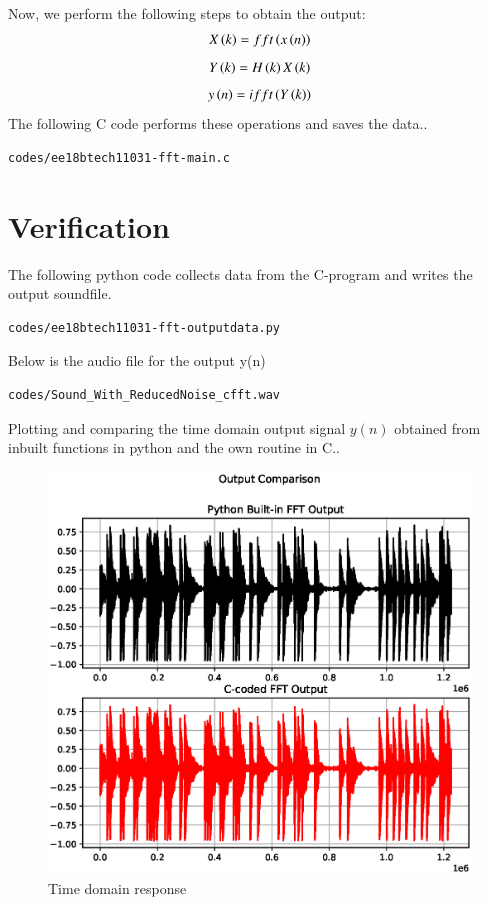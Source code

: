 \documentclass[journal,12pt,twocolumn]{IEEEtran}
\begin{document}
Now, we perform the following steps to obtain the output:
\begin{align}
    X\left(k\right) = fft\left(x\left(n\right)\right)
\end{align}
\begin{align}
    Y\left(k\right) = H\left(k\right)X\left(k\right)
\end{align}
\begin{align}
    y\left(n\right) = ifft\left(Y\left(k\right)\right)
\end{align}
The following C code performs these operations and saves the data.. 
\begin{lstlisting}
codes/ee18btech11031-fft-main.c
\end{lstlisting}
\section{Verification}
The following python code collects data from the C-program and writes the output soundfile.
\begin{lstlisting}
codes/ee18btech11031-fft-outputdata.py
\end{lstlisting}
Below is the audio file for the output y(n)
\begin{lstlisting}
codes/Sound_With_ReducedNoise_cfft.wav
\end{lstlisting}
Plotting and comparing the time domain output signal $y(n)$ obtained from inbuilt functions in python and the own routine in C..
\begin{figure}[!h]
\centering
\includegraphics[width=1.2\columnwidth]{./figs/ee18btech11031.eps}
\caption{Time domain response}
\label{fig:Figure1}
\end{figure}
\end{document}
